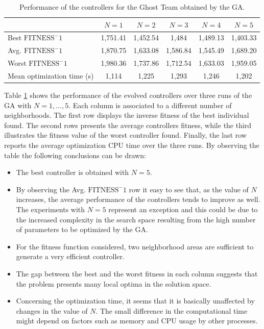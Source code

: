 \documentclass{llncs}
\begin{document}
\begin{table} [htbp]
\centering
{\footnotesize
\begin{tabular}{|p{2cm}||c|c|c|c|c|}
\hline & $N = 1$ & $N = 2$ & $N = 3$ & $N = 4$ & $N = 5$ \\
\hline
Best $\mathrm{FITNESS}^-1$ & 1,751.41 & 1,452.54 & 1,484 & 1,489.13 & 1,403.33 \\
\hline
Avg. $\mathrm{FITNESS}^-1$ & 1,870.75 & 1,633.08 & 1,586.84 & 1,545.49 & 1,689.20 \\
\hline
Worst $\mathrm{FITNESS}^-1$ & 1,980.36 & 1,737.86 & 1,712.54 & 1,633.03 & 1,959.05 \\
\hline
Mean \mbox{optimization} time (s) & 1,114 & 1,225 & 1,293 & 1,246 & 1,202 \\
\hline
\end{tabular}}
\caption{Performance of the controllers for the Ghost Team obtained by the GA.
\label{tab:results_GA}}
\end{table}

Table \ref{tab:results_GA} shows the performance of the evolved controllers over three runs of the GA with $N=1,\ldots,5$. Each column is associated to a different number of neighborhoods. The first row displays the inverse fitness of the best individual found. The second rows presents the average controllers fitness, while the third illustrates the fitness value of the worst controller found. Finally, the last row reports the average optimization CPU time over the three runs. By observing the table the following conclusions can be drawn:

\begin{itemize}
	\item The best controller is obtained with $N=5$.
	\item By observing the Avg. $\mathrm{FITNESS}^-1$ row it easy to see that, as the value of $N$ increases, the average performance of the controllers tends to improve as well. The experiments with $N=5$ represent an exception and this could be due to the increased complexity in the search space resulting from the high number of parameters to be optimized by the GA.
	\item For the fitness function considered, two neighborhood areas are sufficient to generate a very efficient controller.
	\item The gap between the best and the worst fitness in each column suggests that the problem presents many local optima in the solution space.
	\item Concerning the optimization time, it seems that it is basically unaffected by changes in the value of $N$. The small difference in the computational time might depend on factors such as memory and CPU usage by other processes.
\end{itemize}
\end{document}
